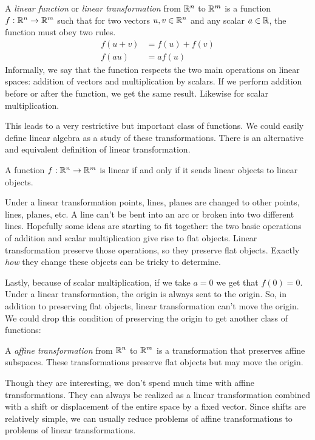 \documentclass[fleqn,letterpaper]{report}
\begin{document}
\begin{defn}
A \emph{linear function} or \emph{linear transformation} from
$\mathbb{R}^n$ to $\mathbb{R}^m$ is a function $f: \mathbb{R}^n \rightarrow \mathbb{R}^m$
such that for two vectors $u,v \in \mathbb{R}^n$ and any scalar $a
\in \mathbb{R}$, the function must obey two rules.
\begin{align*}
f(u+v) & = f(u) + f(v) \\
f(au) & = af(u)
\end{align*}
Informally, we say that the function respects the two main
operations on linear spaces: addition of vectors and
multiplication by scalars. If we perform addition before or after
the function, we get the same result. Likewise for scalar
multiplication.
\end{defn}

This leads to a very restrictive but important class of
functions. We could easily define linear algebra as a study of
these transformations. There is an alternative and equivalent
definition of linear transformation.

\begin{prop}
A function $f: \mathbb{R}^n \rightarrow \mathbb{R}^m$ is linear if and only
if it sends linear objects to linear objects.
\end{prop}

Under a linear transformation points, lines, planes are changed
to other points, lines, planes, etc. A line can't be bent into
an arc or broken into two different lines. Hopefully some
ideas are starting to fit together: the two basic operations
of addition and scalar multiplication give rise to flat
objects. Linear transformation preserve those operations, so
they preserve flat objects. Exactly \emph{how} they change
these objects can be tricky to determine.

Lastly, because of scalar multiplication, if we take $a
= 0$ we get that $f(0) = 0$. Under a linear transformation,
the origin is always sent to the origin. So, in addition to
preserving flat objects, linear transformation can't move the
origin. We could drop this condition of preserving the origin
to get another class of functions:

\begin{defn}
A \emph{affine transformation} from $\mathbb{R}^n$ to $\mathbb{R}^m$ is a
transformation that preserves affine subspaces. These
transformations preserve flat objects but may move the origin. 
\end{defn}

Though they are interesting, we don't spend much time with
affine transformations. They can always be realized as a linear
transformation combined with a shift or displacement of the
entire space by a fixed vector. Since shifts are relatively
simple, we can usually reduce problems of affine
transformations to problems of linear transformations.
\end{document}
